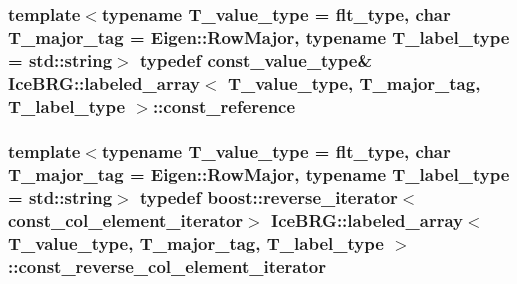 \subsubsection[{const\+\_\+reference}]{\setlength{\rightskip}{0pt plus 5cm}template$<$typename T\+\_\+value\+\_\+type = flt\+\_\+type, char T\+\_\+major\+\_\+tag = Eigen\+::\+Row\+Major, typename T\+\_\+label\+\_\+type = std\+::string$>$ typedef {\bf const\+\_\+value\+\_\+type}\& {\bf Ice\+B\+R\+G\+::labeled\+\_\+array}$<$ T\+\_\+value\+\_\+type, T\+\_\+major\+\_\+tag, T\+\_\+label\+\_\+type $>$\+::{\bf const\+\_\+reference}}\label{classIceBRG_1_1labeled__array_a334a51a867cad5d5c4ad682ebe1fd5a9}
\hypertarget{classIceBRG_1_1labeled__array_a35c6fb77c743e26339b8bb8481861da9}{}
\subsubsection[{const\+\_\+reverse\+\_\+col\+\_\+element\+\_\+iterator}]{\setlength{\rightskip}{0pt plus 5cm}template$<$typename T\+\_\+value\+\_\+type = flt\+\_\+type, char T\+\_\+major\+\_\+tag = Eigen\+::\+Row\+Major, typename T\+\_\+label\+\_\+type = std\+::string$>$ typedef boost\+::reverse\+\_\+iterator$<${\bf const\+\_\+col\+\_\+element\+\_\+iterator}$>$ {\bf Ice\+B\+R\+G\+::labeled\+\_\+array}$<$ T\+\_\+value\+\_\+type, T\+\_\+major\+\_\+tag, T\+\_\+label\+\_\+type $>$\+::{\bf const\+\_\+reverse\+\_\+col\+\_\+element\+\_\+iterator}}\label{classIceBRG_1_1labeled__array_a35c6fb77c743e26339b8bb8481861da9}
\hypertarget{classIceBRG_1_1labeled__array_a7b4b912b75ec933905708199ea2f639d}{}
